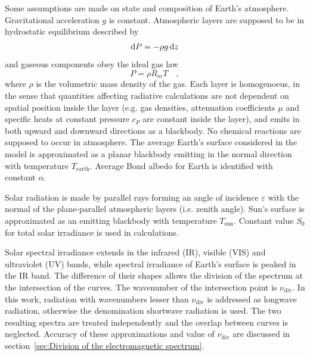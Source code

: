 \documentclass[a4paper,10pt,twocolumn,\classoptions]{article}
\begin{document}
Some assumptions are made on state and composition of Earth's atmosphere. Gravitational acceleration $g$ is constant. Atmospheric layers are supposed to be in hydrostatic equilibrium described by
\begin{equation}
  \label{eq:hydrostatic_equilibrium}
  \odif{P} = - \rho g \odif{z}
\end{equation}
and gaseous components obey the ideal gas law
\begin{equation}
  \label{eq:ideal_gas_law}
  P = \rho R_m T
  \quad ,
\end{equation}
where $\rho$ is the volumetric mass density of the gas.
Each layer is homogenoeus, in the sense that quantities affecting radiative calculations are not dependent on spatial position inside the layer (e.g. gas densities, attenuation coefficients $\mu$ and specific heats at constant pressure $c_P$ are constant inside the layer), and emits in both upward and downward directions as a blackbody. No chemical reactions are supposed to occur in atmosphere.
The average Earth's surface considered in the model is approximated as a planar blackbody emitting in the normal direction with temperature $T_\text{earth}$. Average Bond albedo for Earth is identified with constant $\alpha$.

Solar radiation is made by parallel rays forming an angle of incidence $\varepsilon$ with the normal of the plane-parallel atmospheric layers (i.e. zenith angle). %
Sun's surface is approximated as an emitting blackbody with temperature $T_\text{sun}$. Constant value $S_0$ for total solar irradiance is used in calculations.

Solar spectral irradiance extends in the infrared (IR), visible (VIS) and ultraviolet (UV) bands, while spectral irradiance of Earth's surface is peaked in the IR band. The difference of their shapes allows the division of the spectrum at the intersection of the curves. The wavenumber of the intersection point is $\nu_\text{div}$. In this work, radiation with wavenumbers lesser than $\nu_\text{div}$ is addressed as longwave radiation, otherwise the denomination shortwave radiation is used. The two resulting spectra are treated independently and the overlap between curves is neglected. Accuracy of these approximations and value of $\nu_\text{div}$ are discussed in section~\ref{sec:Division of the electromagnetic spectrum}.
\end{document}
